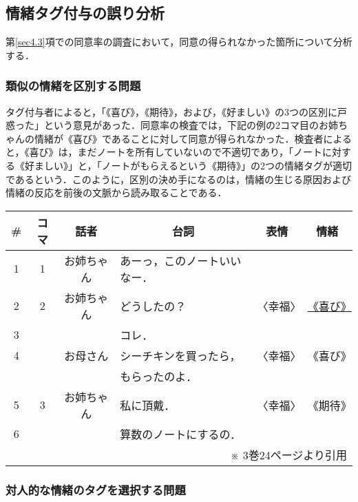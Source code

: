\documentclass[japanese]{jnlp_1.3c}
\begin{document}
\subsection{情緒タグ付与の誤り分析} \label{sec6.1}

    第\ref{sec4.3}項での同意率の調査において，同意の得られなかった箇所について分析する．

    \subsubsection{類似の情緒を区別する問題}

タグ付与者によると，「《喜び》，《期待》，および，《好ましい》の3つの区別に戸惑った」という意見があった．同意率の検査では，下記の例の2コマ目のお姉ちゃんの情緒が《喜び》であることに対して同意が得られなかった．検査者によると，《喜び》は，まだノートを所有していないので不適切であり，「ノートに対する《好ましい》」と，「ノートがもらえるという《期待》」の2つの情緒タグが適切であるという．このように，区別の決め手になるのは，情緒の生じる原因および情緒の反応を前後の文脈から読み取ることである．

\vspace{\baselineskip}
\begin{center}
\begin{tabular}{|c|c|c|l|c|c|}
\hline
\# & コマ & 話者 & \multicolumn{1}{|c|}{台詞} & 表情 & 情緒 \\
\hline
1 & 1 & お姉ちゃん & あーっ，このノートいいなー． & & \\
\hline
2 & 2 & お姉ちゃん & どうしたの？                 &〈幸福〉& \underline{《喜び》} \\
\cline{1-1} \cline{4-4}
3 &   &            & コレ．                       &        & \\
\hline
4 &   & お母さん   & シーチキンを買ったら，       &〈幸福〉&《喜び》\\
  &   &            & もらったのよ．               &        & \\
\hline
5 & 3 & お姉ちゃん & 私に頂戴．                   &〈幸福〉& 《期待》\\
\cline{1-1} \cline{4-4}
6 &   &            & 算数のノートにするの．       &        & \\
\hline
\multicolumn{6}{r}{※ 3巻24ページより引用}
\end{tabular}
\end{center}

    \subsubsection{対人的な情緒のタグを選択する問題}
\end{document}
